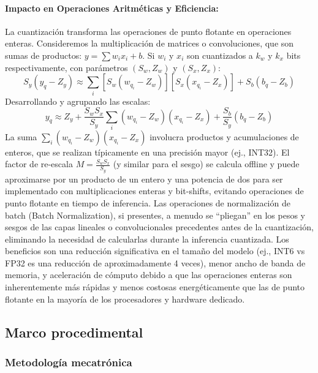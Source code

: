 \documentclass[12pt]{article}
\begin{document}
\paragraph{Impacto en Operaciones Aritméticas y Eficiencia:}
La cuantización transforma las operaciones de punto flotante en operaciones enteras. Consideremos la multiplicación de matrices o convoluciones, que son sumas de productos: $y = \sum w_i x_i + b$. Si $w_i$ y $x_i$ son cuantizados a $k_w$ y $k_x$ bits respectivamente, con parámetros $(S_w, Z_w)$ y $(S_x, Z_x)$:
\begin{equation}
S_y (y_q - Z_y) \approx \sum_i [S_w (w_{q_i} - Z_w)] [S_x (x_{q_i} - Z_x)] + S_b (b_q - Z_b)
\end{equation}
Desarrollando y agrupando las escalas:
\begin{equation}
y_q \approx Z_y + \frac{S_w S_x}{S_y} \sum_i (w_{q_i} - Z_w)(x_{q_i} - Z_x) + \frac{S_b}{S_y} (b_q - Z_b)
\label{eq:quantized_mac_full}
\end{equation}
La suma $\sum_i (w_{q_i} - Z_w)(x_{q_i} - Z_x)$ involucra productos y acumulaciones de enteros, que se realizan típicamente en una precisión mayor (ej., INT32). El factor de re-escala $M = \frac{S_w S_x}{S_y}$ (y similar para el sesgo) se calcula offline y puede aproximarse por un producto de un entero y una potencia de dos para ser implementado con multiplicaciones enteras y bit-shifts, evitando operaciones de punto flotante en tiempo de inferencia. Las operaciones de normalización de batch (Batch Normalization), si presentes, a menudo se ``pliegan'' en los pesos y sesgos de las capas lineales o convolucionales precedentes antes de la cuantización, eliminando la necesidad de calcularlas durante la inferencia cuantizada.
Los beneficios son una reducción significativa en el tamaño del modelo (ej., INT6 vs FP32 es una reducción de aproximadamente 4 veces), menor ancho de banda de memoria, y aceleración de cómputo debido a que las operaciones enteras son inherentemente más rápidas y menos costosas energéticamente que las de punto flotante en la mayoría de los procesadores y hardware dedicado.


\subsection{Marco procedimental}
\subsubsection{Metodología mecatrónica}
\label{ssec:metodologia_scrum}
\end{document}
